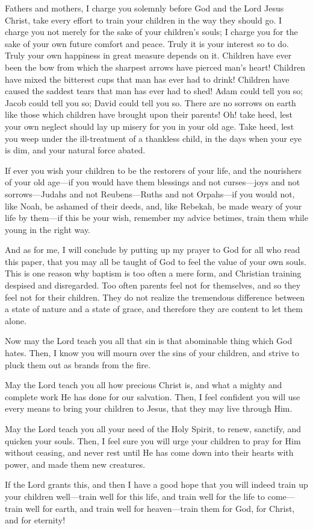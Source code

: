 \documentclass[
]{book}
\begin{document}
Fathers and mothers, I charge you solemnly before God and the Lord Jesus Christ, take every effort to train your children in the way they should go. I charge you not merely for the sake of your children's souls; I charge you for the sake of your own future comfort and peace. Truly it is your interest so to do. Truly your own happiness in great measure depends on it. Children have ever been the bow from which the sharpest arrows have pierced man's heart! Children have mixed the bitterest cups that man has ever had to drink! Children have caused the saddest tears that man has ever had to shed! Adam could tell you so; Jacob could tell you so; David could tell you so. There are no sorrows on earth like those which children have brought upon their parents! Oh! take heed, lest your own neglect should lay up misery for you in your old age. Take heed, lest you weep under the ill-treatment of a thankless child, in the days when your eye is dim, and your natural force abated.

If ever you wish your children to be the restorers of your life, and the nourishers of your old age---if you would have them blessings and not curses---joys and not sorrows---Judahs and not Reubens---Ruths and not Orpahs---if you would not, like Noah, be ashamed of their deeds, and, like Rebekah, be made weary of your life by them---if this be your wish, remember my advice betimes, train them while young in the right way.

And as for me, I will conclude by putting up my prayer to God for all who read this paper, that you may all be taught of God to feel the value of your own souls. This is one reason why baptism is too often a mere form, and Christian training despised and disregarded. Too often parents feel not for themselves, and so they feel not for their children. They do not realize the tremendous difference between a state of nature and a state of grace, and therefore they are content to let them alone.

Now may the Lord teach you all that sin is that abominable thing which God hates. Then, I know you will mourn over the sins of your children, and strive to pluck them out as brands from the fire.

May the Lord teach you all how precious Christ is, and what a mighty and complete work He has done for our salvation. Then, I feel confident you will use every means to bring your children to Jesus, that they may live through Him.

May the Lord teach you all your need of the Holy Spirit, to renew, sanctify, and quicken your souls. Then, I feel sure you will urge your children to pray for Him without ceasing, and never rest until He has come down into their hearts with power, and made them new creatures.

If the Lord grants this, and then I have a good hope that you will indeed train up your children well---train well for this life, and train well for the life to come---train well for earth, and train well for heaven---train them for God, for Christ, and for eternity!
\end{document}
